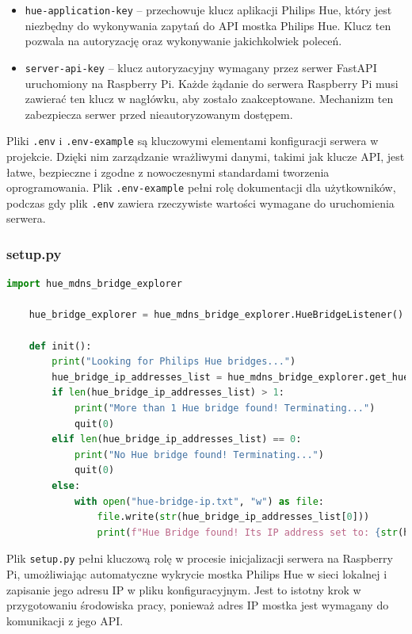 \documentclass[12pt]{article}
\begin{document}
\begin{itemize}
    \item \texttt{hue-application-key} – przechowuje klucz aplikacji Philips Hue, który jest niezbędny do wykonywania zapytań do API mostka Philips Hue. Klucz ten pozwala
          na autoryzację oraz wykonywanie jakichkolwiek poleceń.
    \item \texttt{server-api-key} – klucz autoryzacyjny wymagany przez serwer FastAPI uruchomiony na Raspberry Pi. Każde żądanie do serwera Raspberry Pi musi zawierać ten
          klucz w nagłówku, aby zostało zaakceptowane. Mechanizm ten zabezpiecza serwer przed nieautoryzowanym dostępem.
\end{itemize}
Pliki \texttt{.env} i \texttt{.env-example} są kluczowymi elementami konfiguracji serwera w projekcie. Dzięki nim zarządzanie wrażliwymi danymi, takimi jak klucze API,
jest łatwe, bezpieczne i zgodne z nowoczesnymi standardami tworzenia oprogramowania. Plik \texttt{.env-example} pełni rolę dokumentacji dla użytkowników, podczas gdy plik
\texttt{.env} zawiera rzeczywiste wartości wymagane do uruchomienia serwera.

\subsubsection{setup.py}
\begin{lstlisting}[language=Python]
    import hue_mdns_bridge_explorer
    
    hue_bridge_explorer = hue_mdns_bridge_explorer.HueBridgeListener()
    
    def init():
        print("Looking for Philips Hue bridges...")
        hue_bridge_ip_addresses_list = hue_mdns_bridge_explorer.get_hue_bridge_ips()
        if len(hue_bridge_ip_addresses_list) > 1:
            print("More than 1 Hue bridge found! Terminating...")
            quit(0)
        elif len(hue_bridge_ip_addresses_list) == 0:
            print("No Hue bridge found! Terminating...")
            quit(0)
        else:
            with open("hue-bridge-ip.txt", "w") as file:
                file.write(str(hue_bridge_ip_addresses_list[0]))
                print(f"Hue Bridge found! Its IP address set to: {str(hue_bridge_ip_addresses_list[0])}")
\end{lstlisting}
Plik \texttt{setup.py} pełni kluczową rolę w procesie inicjalizacji serwera na Raspberry Pi, umożliwiając automatyczne wykrycie mostka Philips Hue w sieci lokalnej i
zapisanie jego adresu IP w pliku konfiguracyjnym. Jest to istotny krok w przygotowaniu środowiska pracy, ponieważ adres IP mostka jest wymagany do komunikacji z jego API.
\end{document}
